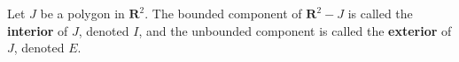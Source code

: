 Let $J$ be a polygon in $\mathbf{R}^2$. The bounded component of $\mathbf{R}^2 - J$ is called the \textbf{interior} of $J$, denoted $I$, and the unbounded component is called the \textbf{exterior} of $J$, denoted $E$.
